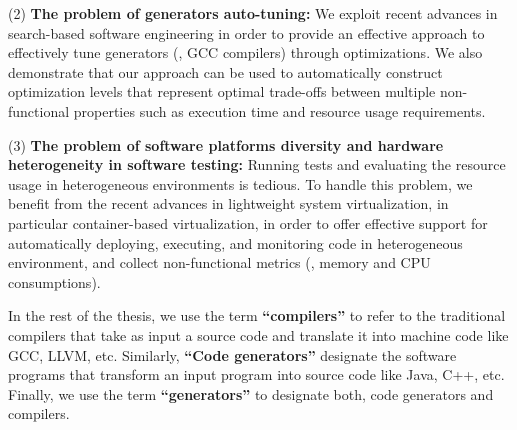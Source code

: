 	(2) \textbf{The problem of generators auto-tuning:}  
	We exploit recent advances in search-based software engineering in order to provide an effective approach to effectively tune generators (\eg, GCC compilers) through optimizations. We also demonstrate that our approach can be used to automatically construct optimization levels that represent optimal trade-offs between multiple non-functional properties such as execution time and resource usage requirements. 

	(3) \textbf{The problem of software platforms diversity and hardware heterogeneity in software testing:} Running tests and evaluating the resource usage in heterogeneous environments is tedious. To handle this problem, we benefit from the recent advances in lightweight system virtualization, in particular container-based virtualization, in order to offer effective support for automatically deploying, executing, and monitoring code in heterogeneous environment, and collect non-functional metrics (\eg, memory and CPU consumptions).
	

In the rest of the thesis, we use the term \textbf{``compilers''} to refer to the traditional compilers that take as input a source code and translate it into machine code like GCC, LLVM, etc. Similarly, \textbf{``Code generators''} designate the software programs that transform an input program into source code like Java, C++, etc. Finally, we use the term \textbf{``generators''} to designate both, code generators and compilers. 

